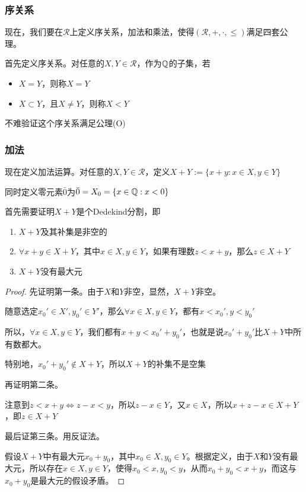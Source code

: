 \subsubsection*{序关系}

现在，我们要在$\mathcal{R}$上定义序关系，加法和乘法，使得$(\mathcal{R},+,\cdot,\leq)$满足四套公理。

首先定义序关系。对任意的$X,Y\in\mathcal{R}$，作为$\mathbb{Q}$的子集，若

\begin{itemize}
    \item $X=Y$，则称$X=Y$
    \item $X\subset Y$，且$X\neq Y$，则称$X<Y$
\end{itemize}

不难验证这个序关系满足公理(O)

\subsubsection*{加法}

现在定义加法运算。对任意的$X,Y\in\mathcal{R}$，定义$X+Y:=\{x+y:x\in X,y\in Y\}$

同时定义零元素$\bar{0}$为$\bar{0}=X_0=\{x\in \mathbb{Q}:x<0\}$

首先需要证明$X+Y$是个Dedekind分割，即

\begin{enumerate}
    \item $X+Y$及其补集是非空的
    \item $\forall x+y\in X+Y$，其中$x\in X,y\in Y$，如果有理数$z<x+y$，那么$z\in X+Y$
    \item $X+Y$没有最大元
\end{enumerate}

\begin{proof}
    先证明第一条。由于$X$和$Y$非空，显然，$X+Y$非空。

    随意选定$x_0'\in X',y_0'\in Y'$，那么$\forall x\in X,y\in Y$，都有$x<x_0',y<y_0'$
    
    所以，$\forall x\in X,y\in Y$，我们都有$x+y<x_0'+y_0'$，也就是说$x_0'+y_0'$比$X+Y$中所有数都大。
    
    特别地，$x_0'+y_0'\notin X+Y$，所以$X+Y$的补集不是空集

    再证明第二条。

    注意到$z<x+y\Leftrightarrow z-x<y$，所以$z-x\in Y$，又$x\in X$，所以$x+z-x\in X+Y$，即$z\in X+Y$

    最后证第三条。用反证法。

    假设$X+Y$中有最大元$x_0+y_0$，其中$x_0\in X,y_0\in Y$。根据定义，由于$X$和$Y$没有最大元，所以存在$x\in X,y\in Y$，使得$x_0<x,y_0<y$，从而$x_0+y_0<x+y$，而这与$x_0+y_0$是最大元的假设矛盾。
\end{proof}

